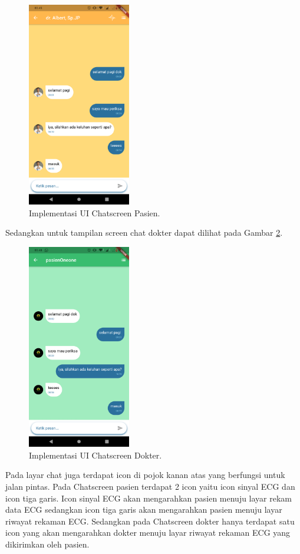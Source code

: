 \begin{figure}[H] \centering
	\includegraphics[width=0.4\textwidth]{img/layar_chatpasien.png}
	\caption{Implementasi UI Chatscreen Pasien.}
	\label{fig:3.10}
\end{figure}

Sedangkan untuk tampilan screen chat dokter dapat dilihat pada Gambar \ref{fig:3.11}.

\begin{figure}[H] \centering
	\includegraphics[width=0.4\textwidth]{img/layar_chatdokter.png}
	\caption{Implementasi UI Chatscreen Dokter.}
	\label{fig:3.11}
\end{figure}

Pada layar chat juga terdapat icon di pojok kanan atas yang berfungsi untuk jalan pintas. Pada Chatscreen pasien terdapat 2 icon yaitu icon sinyal ECG dan icon tiga garis. Icon sinyal ECG akan mengarahkan pasien menuju layar rekam data ECG sedangkan icon tiga garis akan mengarahkan pasien menuju layar riwayat rekaman ECG.
Sedangkan pada Chatscreen dokter hanya terdapat satu icon yang akan mengarahkan dokter menuju layar riwayat rekaman ECG yang dikirimkan oleh pasien. 
\clearpage

